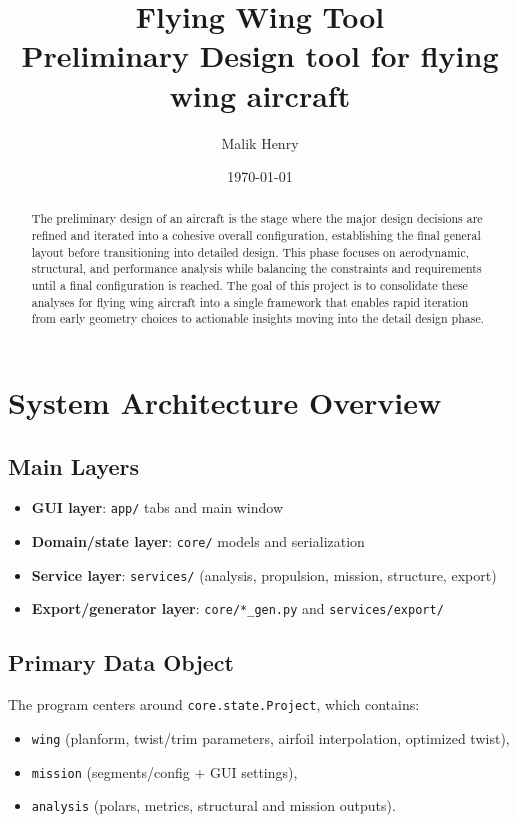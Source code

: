 ﻿\documentclass[11pt]{article}
\title{Flying Wing Tool\\Preliminary Design tool for flying wing aircraft}
\author{Malik Henry}
\date{\today}
\begin{document}
\maketitle

\begin{abstract}
The preliminary design of an aircraft is the stage where the major design decisions are refined and iterated into a cohesive overall configuration, establishing the final general layout before transitioning into detailed design. This phase focuses on aerodynamic, structural, and performance analysis while balancing the constraints and requirements until a final configuration is reached. The goal of this project is to consolidate these analyses for flying wing aircraft into a single framework that enables rapid iteration from early geometry choices to actionable insights moving into the detail design phase. 
\end{abstract}

\section{System Architecture Overview}
\subsection{Main Layers}
\begin{itemize}
\item \textbf{GUI layer}: \texttt{app/} tabs and main window
\item \textbf{Domain/state layer}: \texttt{core/} models and serialization
\item \textbf{Service layer}: \texttt{services/} (analysis, propulsion, mission, structure, export)
\item \textbf{Export/generator layer}: \texttt{core/*\_gen.py} and \texttt{services/export/}
\end{itemize}

\subsection{Primary Data Object}
The program centers around \texttt{core.state.Project}, which contains:
\begin{itemize}
\item \texttt{wing} (planform, twist/trim parameters, airfoil interpolation, optimized twist),
\item \texttt{mission} (segments/config + GUI settings),
\item \texttt{analysis} (polars, metrics, structural and mission outputs).
\end{itemize}
\end{document}
